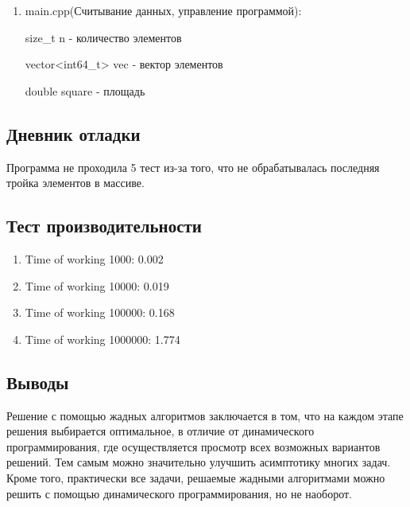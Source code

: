 \documentclass[12pt]{article}
\begin{document}
\begin{enumerate}
\item main.cpp(Считывание данных, управление программой):
\par size\_t n - количество элементов
\par vector<int64\_t> vec - вектор элементов
\par double square - площадь
\end{enumerate}

\subsection*{Дневник отладки}

Программа не проходила 5 тест из-за того, что не обрабатывалась последняя тройка элементов в массиве.

\subsection*{Тест производительности}

\begin{enumerate}
	\item Time of working 1000: 0.002
	\item Time of working 10000: 0.019
	\item Time of working 100000: 0.168
	\item Time of working 1000000: 1.774
	
\end{enumerate}
\subsection*{Выводы}
\par Решение с помощью жадных алгоритмов заключается в том, что на каждом этапе решения выбирается оптимальное, в отличие от динамического программирования, где осуществляется просмотр всех возможных вариантов решений. Тем самым можно значительно улучшить асимптотику многих задач. Кроме того, практически все задачи, решаемые жадными алгоритмами можно решить с помощью динамического программирования, но не наоборот.
\end{document}
